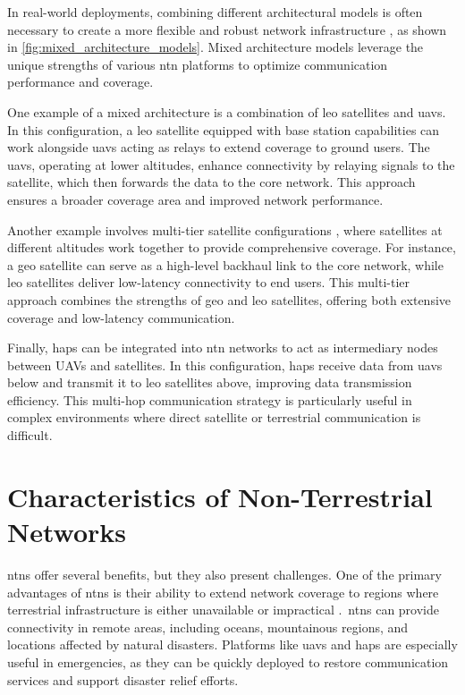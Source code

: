 In real-world deployments, combining different architectural models is often necessary to create a more flexible and robust network infrastructure \autocite{hybrid_satellite_terrestrial_networks}, as shown in \cref{fig:mixed_architecture_models}. Mixed architecture models leverage the unique strengths of various \gls{ntn} platforms to optimize communication performance and coverage.

One example of a mixed architecture is a combination of \gls{leo} satellites and \glspl{uav}. In this configuration, a \gls{leo} satellite equipped with base station capabilities can work alongside \glspl{uav} acting as relays to extend coverage to ground users. The \glspl{uav}, operating at lower altitudes, enhance connectivity by relaying signals to the satellite, which then forwards the data to the core network. This approach ensures a broader coverage area and improved network performance.

Another example involves multi-tier satellite configurations \autocite{5g_allstar}, where satellites at different altitudes work together to provide comprehensive coverage. For instance, a \gls{geo} satellite can serve as a high-level backhaul link to the core network, while \gls{leo} satellites deliver low-latency connectivity to end users. This multi-tier approach combines the strengths of \gls{geo} and \gls{leo} satellites, offering both extensive coverage and low-latency communication.

Finally, \glspl{hap} can be integrated into \gls{ntn} networks to act as intermediary nodes between UAVs and satellites. In this configuration, \glspl{hap} receive data from \glspl{uav} below and transmit it to \gls{leo} satellites above, improving data transmission efficiency. This multi-hop communication strategy is particularly useful in complex environments where direct satellite or terrestrial communication is difficult.

\section{Characteristics of Non-Terrestrial Networks}\label{sec:characteristics_of_non_terrestrial_networks}

\glspl{ntn} offer several benefits, but they also present challenges. One of the primary advantages of \glspl{ntn} is their ability to extend network coverage to regions where terrestrial infrastructure is either unavailable or impractical \autocite{evolution_ntn_from_5g_6g_survey}.\ \glspl{ntn} can provide connectivity in remote areas, including oceans, mountainous regions, and locations affected by natural disasters. Platforms like \glspl{uav} and \glspl{hap} are especially useful in emergencies, as they can be quickly deployed to restore communication services and support disaster relief efforts.

